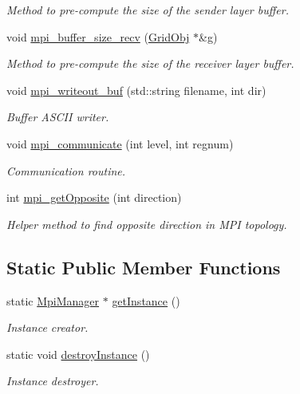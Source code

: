 \begin{DoxyCompactItemize}
\begin{DoxyCompactList}\small\item\em Method to pre-\/compute the size of the sender layer buffer. \end{DoxyCompactList}\item 
void \hyperlink{class_mpi_manager_afa7547c05583bf6c52ea48cc1dc13336}{mpi\+\_\+buffer\+\_\+size\+\_\+recv} (\hyperlink{class_grid_obj}{Grid\+Obj} $\ast$\&g)
\begin{DoxyCompactList}\small\item\em Method to pre-\/compute the size of the receiver layer buffer. \end{DoxyCompactList}\item 
void \hyperlink{class_mpi_manager_ab498bdf0822e2747f83c187d682dd934}{mpi\+\_\+writeout\+\_\+buf} (std\+::string filename, int dir)
\begin{DoxyCompactList}\small\item\em Buffer A\+S\+C\+II writer. \end{DoxyCompactList}\item 
void \hyperlink{class_mpi_manager_aedcf84c06fc3e0486fac61d09ce0a268}{mpi\+\_\+communicate} (int level, int regnum)
\begin{DoxyCompactList}\small\item\em Communication routine. \end{DoxyCompactList}\item 
int \hyperlink{class_mpi_manager_a3c10ab477c2e4387d6a02104f9b2a2ea}{mpi\+\_\+get\+Opposite} (int direction)
\begin{DoxyCompactList}\small\item\em Helper method to find opposite direction in M\+PI topology. \end{DoxyCompactList}\end{DoxyCompactItemize}
\subsection*{Static Public Member Functions}
\begin{DoxyCompactItemize}
\item 
static \hyperlink{class_mpi_manager}{Mpi\+Manager} $\ast$ \hyperlink{class_mpi_manager_a486e424ae1b9dfa3218d260b0f9a0a2f}{get\+Instance} ()
\begin{DoxyCompactList}\small\item\em Instance creator. \end{DoxyCompactList}\item 
static void \hyperlink{class_mpi_manager_a03b7914615ccb6e7b8a285f50860d503}{destroy\+Instance} ()
\begin{DoxyCompactList}\small\item\em Instance destroyer. \end{DoxyCompactList}\end{DoxyCompactItemize}
